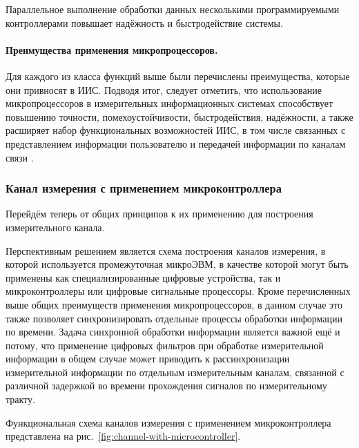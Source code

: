 \documentclass[a4paper, 14pt, titlepage]{extarticle}
\let\oldparagraph\paragraph
\renewcommand{\paragraph}[1]{\oldparagraph{\indent #1}}
\begin{document}
  Параллельное выполнение обработки данных несколькими программируемыми
  контроллерами повышает надёжность и быстродействие системы.

  \paragraph{Преимущества применения микропроцессоров.}
  Для каждого из класса функций выше были перечислены преимущества, которые они привносят в ИИС.
  Подводя итог, следует отметить, что использование микропроцессоров в измерительных информационных системах способствует
  повышению точности, помехоустойчивости, быстродействия, надёжности, а также расширяет набор
  функциональных возможностей ИИС, в том числе связанных с представлением информации пользователю
  и передачей информации по каналам связи \cite{klaassen-methods}.

  \subsubsection{Канал измерения с применением микроконтроллера}

  Перейдём теперь от общих принципов к их применению для построения измерительного канала.

  Перспективным решением является схема построения каналов измерения, в которой
  используется промежуточная микроЭВМ, в качестве которой могут быть применены как
  специализированные цифровые устройства, так и микроконтроллеры или цифровые сигнальные процессоры.
  Кроме перечисленных выше общих преимуществ применения микропроцессоров, в данном случае это также
  позволяет синхронизировать отдельные процессы обработки информации по времени. Задача синхронной обработки информации
  является важной ещё и потому, что применение цифровых фильтров при обработке измерительной
  информации в общем случае может приводить к рассинхронизации измерительной информации по отдельным
  измерительным каналам, связанной с различной задержкой во времени прохождения сигналов по
  измерительному тракту.

  Функциональная схема каналов измерения с применением микроконтроллера  представлена на
  рис.~\ref{fig:channel-with-microcontroller}.
\end{document}
